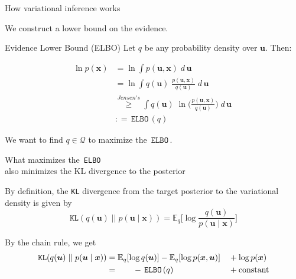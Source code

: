 \documentclass[10pt]{beamer}
\numberwithin{equation}{section}
\theoremstyle{definition}
\newcommand{\ds}{\displaystyle}
\newcommand{\df}{\displaystyle\frac}
\newcommand{\+}[1]{\ensuremath{{\boldsymbol #1}}} %
\newcommand{\cond}{\; | \;}
\newcommand{\E}{\mathbb{E}}
\newcommand{\Q}{\mathcal{Q}}
\newcommand{\wrt}[1]{\; d \,{#1} \;}
\newcommand{\VLBO}{\,\texttt{VLBO}\,}
\newcommand{\ELBO}{\,\texttt{ELBO}\,}
\begin{document}
\begin{frame}{How variational inference works}
 

We construct a lower bound on the evidence. 

\begin{block}{Evidence Lower Bound (ELBO)}
Let $q$ be any probability density over $\+u$. Then:

\begin{align*}
\ln p(\+x) & = \ln \ds\int  p(\+u, \+x) \wrt{\+u}  \\ 
& = \ln \ds\int  q(\+u) \; \df{p(\+u, \+x  )}{q(\+u)} \wrt{\+u}  \\ 
& \stackrel{Jensen's}{\geq} \ds\int  q(\+u) \; \ln \bigg( \df{p(\+u, \+x)}{q(\+u)} \bigg) \wrt{\+u} \\
& : = \ELBO(q) 
\end{align*}
\end{block} 

We want to find $q \in \mathcal{Q}$ to maximize the $\ELBO$.
 

\end{frame} 
%


\begin{frame}{What maximizes the \ELBO \\ also minimizes the KL divergence to the posterior}  


By definition, the \texttt{KL} divergence from the target posterior to the variational density is given by
\begin{equation*}
\texttt{KL} (q(\+u) \; || \; p(\+u \cond \+x)) =  \E_q \bigg[\log \df{q(\+u )}{p(\+u \cond \+x)} \bigg] 
\end{equation*}

 


By the chain rule, we get 
\begin{align*} 
 \texttt{KL} (q(\+u) \; || \; p(\+u \cond \+x)) & =  \E_q[\log q(\+u )]  - \E_q[ \log p(\+x,\+u )] &&+\log p(\+x) \\
 & = \hphantom{blah} -\ELBO(q)  && +  \text{constant} 
 \end{align*}
 

 


\end{frame}
\end{document}
